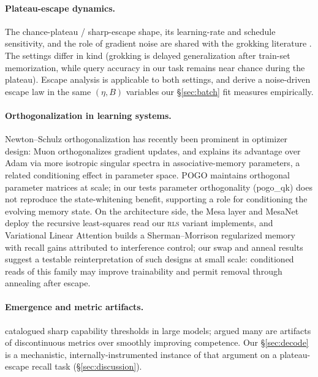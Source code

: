 \documentclass[11pt]{article}
\begin{document}
\paragraph{Plateau-escape dynamics.} The chance-plateau / sharp-escape shape,
its learning-rate and schedule sensitivity, and the role of gradient noise are
shared with the grokking literature \citep{power2022grokking}. The settings
differ in kind (grokking is delayed generalization after train-set
memorization, while query accuracy in our task remains near chance during the plateau). Escape
analysis is applicable to both settings, and \citet{ersoy2026metastable} derive a noise-driven
escape law in the same $(\eta, B)$ variables our \S\ref{sec:batch} fit measures
empirically.

\paragraph{Orthogonalization in learning systems.} Newton--Schulz orthogonalization
\citep{bjorck1971iterative,higham2008functions} has recently been prominent in
optimizer design: Muon \citep{jordan2024muon,bernstein2024old} orthogonalizes
gradient updates, and \citet{wang2025muonmemory} explains its advantage over Adam
via more isotropic singular spectra in associative-memory parameters, a
related conditioning effect in parameter space. POGO
\citep{javaloy2026pogo} maintains orthogonal parameter matrices at scale; in our
tests parameter orthogonality (pogo\_qk) does not reproduce the state-whitening
benefit, supporting a role for conditioning the evolving memory state. On the
architecture side, the Mesa layer and MesaNet
\citep{vonoswald2023mesa,vonoswald2025mesanet} deploy the recursive least-squares
read our \textsc{rls} variant implements, and Variational Linear Attention
\citep{pandey2026vla} builds a Sherman--Morrison regularized memory with recall
gains attributed to interference control; our swap and anneal results suggest a
testable reinterpretation of such designs at small scale: conditioned reads of
this family may improve trainability and permit removal through annealing
after escape.

\paragraph{Emergence and metric artifacts.} \citet{wei2022emergent} catalogued
sharp capability thresholds in large models; \citet{schaeffer2023mirage} argued many
are artifacts of discontinuous metrics over smoothly improving competence. Our
\S\ref{sec:decode} is a mechanistic, internally-instrumented instance of that
argument on a plateau-escape recall task (\S\ref{sec:discussion}).
\end{document}
